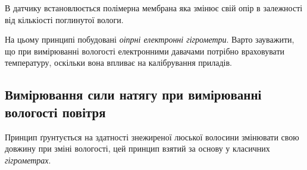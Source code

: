 В датчику встановлюється полімерна мембрана яка змінює свій опір в залежності від кількіості
поглинутої вологи.

На цьому принципі побудовані \textit{оіпрні електронні гігрометри}. Варто зауважити, що при
вимірюванні вологості електронними давачами потрібно враховувати температуру, оскільки вона впливає
на калібрування приладів.

\subsection{Вимірювання сили натягу при вимірюванні вологості повітря}

Принцип ґрунтується на здатності знежиреної люської волосини змінювати свою довжину при зміні
вологості, цей принцип взятий за основу у класичних \textit{гігрометрах}.
